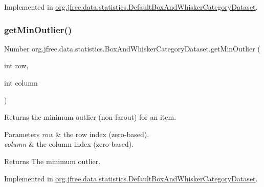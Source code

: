 Implemented in \mbox{\hyperlink{classorg_1_1jfree_1_1data_1_1statistics_1_1_default_box_and_whisker_category_dataset_a2db62c7c2bbb443cb7f03058c64c2a76}{org.\+jfree.\+data.\+statistics.\+Default\+Box\+And\+Whisker\+Category\+Dataset}}.

\mbox{\label{interfaceorg_1_1jfree_1_1data_1_1statistics_1_1_box_and_whisker_category_dataset_a8a593c6f2cde6255302a043f2460a71e}} 
\subsubsection{\texorpdfstring{get\+Min\+Outlier()}{getMinOutlier()}\hspace{0.1cm}{\footnotesize\ttfamily [1/2]}}
{\footnotesize\ttfamily Number org.\+jfree.\+data.\+statistics.\+Box\+And\+Whisker\+Category\+Dataset.\+get\+Min\+Outlier (\begin{DoxyParamCaption}\item[{int}]{row,  }\item[{int}]{column }\end{DoxyParamCaption})}

Returns the minimum outlier (non-\/farout) for an item.


\begin{DoxyParams}{Parameters}
{\em row} & the row index (zero-\/based). \\
\hline
{\em column} & the column index (zero-\/based).\\
\hline
\end{DoxyParams}
\begin{DoxyReturn}{Returns}
The minimum outlier. 
\end{DoxyReturn}


Implemented in \mbox{\hyperlink{classorg_1_1jfree_1_1data_1_1statistics_1_1_default_box_and_whisker_category_dataset_acf000af1f8d26934b89f80eb042e3b82}{org.\+jfree.\+data.\+statistics.\+Default\+Box\+And\+Whisker\+Category\+Dataset}}.

\mbox{\label{interfaceorg_1_1jfree_1_1data_1_1statistics_1_1_box_and_whisker_category_dataset_a8704ec25c8e5e50c44be3d2fd43bc565}} 
